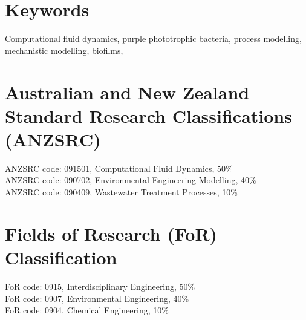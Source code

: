 \section*{Keywords}

Computational fluid dynamics, purple phototrophic bacteria, process modelling, mechanistic modelling, biofilms, 

\section*{Australian and New Zealand Standard Research Classifications (ANZSRC)}


\noindent
ANZSRC code: 091501, Computational Fluid Dynamics, 50\% \\
ANZSRC code: 090702, Environmental Engineering Modelling, 40\% \\
ANZSRC code: 090409, Wastewater Treatment Processes, 10\%


\section*{Fields of Research (FoR) Classification}


FoR code: 0915, Interdisciplinary Engineering, 50\% \\
FoR code: 0907, Environmental Engineering, 40\% \\
FoR code: 0904, Chemical Engineering, 10\%
\clearpage

\pagestyle{headings}

\tableofcontents
	\clearpage
\listoffigures
	\clearpage
\listoftables



